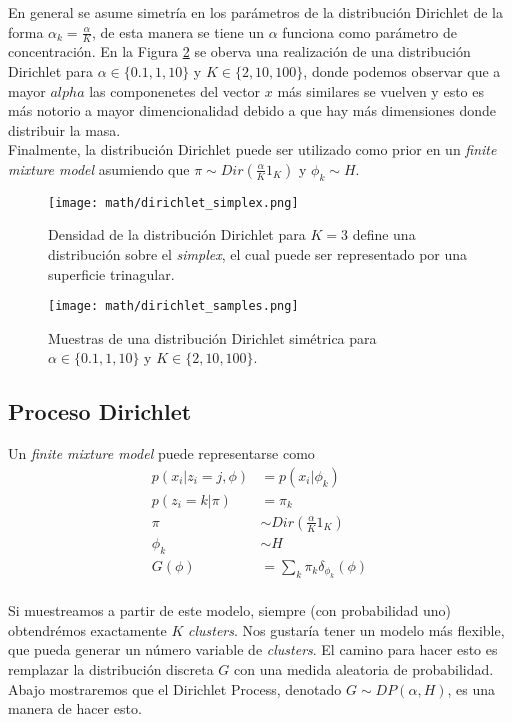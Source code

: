 \documentclass[letterpaper,12pt,oneside]{book} %
\begin{document}
En general se asume simetría en los parámetros de la distribución Dirichlet de la forma $\alpha_{k}=\frac{\alpha}{K}$, de esta manera se tiene un $\alpha$ funciona como parámetro de concentración. En la Figura \ref{img:dirichlet_samples} se oberva una realización de una distribución Dirichlet para $\alpha \in \{0.1, 1, 10\}$ y $K\in\{2, 10, 100\}$, donde podemos observar que a mayor $alpha$ las componenetes del vector $x$ más similares se vuelven y esto es más notorio a mayor dimencionalidad debido a que hay más dimensiones donde distribuir la masa.\\

Finalmente, la distribución Dirichlet puede ser utilizado como prior en un \textit{finite mixture model} asumiendo que $\pi\sim Dir(\frac{\alpha}{K}1_{K})$ y $\phi_{k} \sim H$.

\begin{figure}
    \centering
    \texttt{[image: math/dirichlet\_simplex.png]}
    \caption{Densidad de la distribución Dirichlet para $K=3$ define una distribución sobre el \textit{simplex}, el cual puede ser representado por una superficie trinagular.}
    \label{img:dirichlet_distribution}
\end{figure}

\begin{figure}
    \centering
    \texttt{[image: math/dirichlet\_samples.png]}
    \caption{Muestras de una distribución Dirichlet simétrica para $\alpha \in \{0.1, 1, 10\}$ y $K\in\{2, 10, 100\}$.}
    \label{img:dirichlet_samples}
\end{figure}

\subsection{Proceso Dirichlet}

Un \textit{finite mixture model} puede representarse como 
\begin{align}
    p(x_{i}|z_{i}=j, \phi) &= p(x_{i}|\phi_{k})\\
    p(z_{i}=k|\pi) &= \pi_{k}\\
    \pi &\sim Dir(\frac{\alpha}{K}1_{K})\\
    \phi_{k} & \sim H\\
    G(\phi) &= \sum_{k} \pi_{k}\delta_{\phi_{k}}(\phi)\\
\end{align}

Si muestreamos a partir de este modelo, siempre (con probabilidad uno) obtendrémos exactamente $K$ \textit{clusters}. Nos gustaría tener un modelo más flexible, que pueda generar un número variable de \textit{clusters}. El camino para hacer esto es remplazar la distribución discreta $G$ con una medida aleatoria de probabilidad. Abajo mostraremos que el Dirichlet Process, denotado $G\sim DP(\alpha, H)$, es una manera de hacer esto.\\
\end{document}
